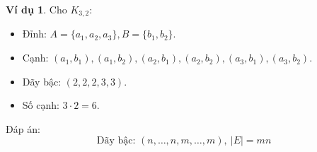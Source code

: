 \documentclass[a4paper,12pt]{article}
\theoremstyle{plain}
\theoremstyle{definition}
\newtheorem{example}{Ví dụ}
\begin{document}
\begin{example}
Cho \( K_{3,2} \):
\begin{itemize}
    \item Đỉnh: \( A = \{a_1, a_2, a_3\}, B = \{b_1, b_2\} \).
    \item Cạnh: \( (a_1, b_1), (a_1, b_2), (a_2, b_1), (a_2, b_2), (a_3, b_1), (a_3, b_2) \).
    \item Dãy bậc: \( (2, 2, 2, 3, 3) \).
    \item Số cạnh: \( 3 \cdot 2 = 6 \).
\end{itemize}
\end{example}

Đáp án:
\[
\boxed{\text{Dãy bậc: } (n, \ldots, n, m, \ldots, m), \ |E| = mn}
\]
\end{document}
